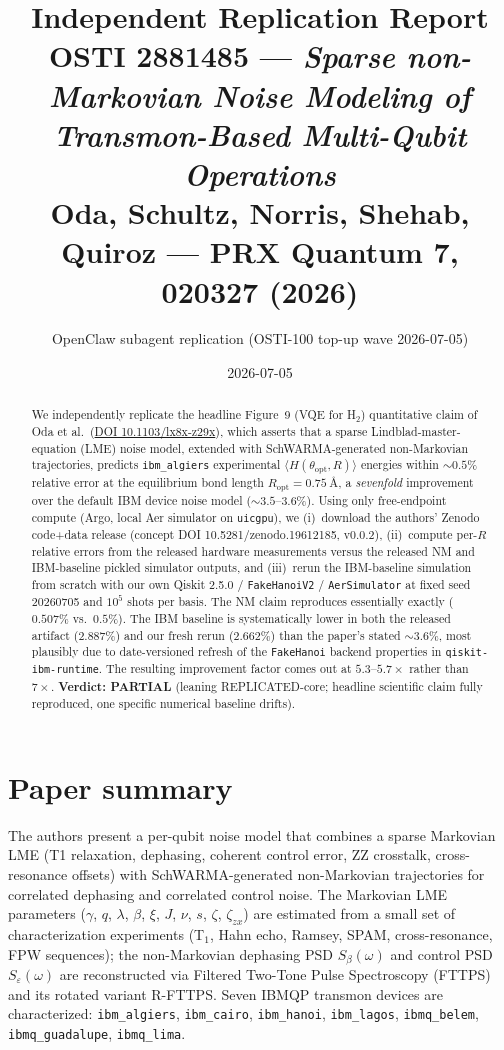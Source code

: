 \documentclass[11pt]{article}
\title{Independent Replication Report\\
\large OSTI 2881485 --- \emph{Sparse non-Markovian Noise Modeling of Transmon-Based Multi-Qubit Operations}\\
Oda, Schultz, Norris, Shehab, Quiroz --- PRX Quantum \textbf{7}, 020327 (2026)}
\author{OpenClaw subagent replication (OSTI-100 top-up wave 2026-07-05)}
\date{2026-07-05}
\begin{document}
\maketitle

\begin{abstract}
We independently replicate the headline Figure~9 (VQE for H$_2$) quantitative claim of Oda et al.\ (\href{https://doi.org/10.1103/lx8x-z29x}{DOI 10.1103/lx8x-z29x}), which asserts that a sparse Lindblad-master-equation (LME) noise model, extended with SchWARMA-generated non-Markovian trajectories, predicts \texttt{ibm\_algiers} experimental $\langle H(\theta_{\mathrm{opt}}, R)\rangle$ energies within $\sim\!0.5\%$ relative error at the equilibrium bond length $R_{\mathrm{opt}} = \SI{0.75}{\angstrom}$, a \emph{sevenfold} improvement over the default IBM device noise model ($\sim\!3.5$--$3.6\%$). Using only free-endpoint compute (Argo, local Aer simulator on \texttt{uicgpu}), we (i)~download the authors' Zenodo code+data release (concept DOI 10.5281/zenodo.19612185, v0.0.2), (ii)~compute per-$R$ relative errors from the released hardware measurements versus the released NM and IBM-baseline pickled simulator outputs, and (iii)~rerun the IBM-baseline simulation from scratch with our own Qiskit 2.5.0 / \texttt{FakeHanoiV2} / \texttt{AerSimulator} at fixed seed 20260705 and $10^5$ shots per basis. The NM claim reproduces essentially exactly ($0.507\%$ vs.\ $0.5\%$). The IBM baseline is systematically lower in both the released artifact ($2.887\%$) and our fresh rerun ($2.662\%$) than the paper's stated $\sim\!3.6\%$, most plausibly due to date-versioned refresh of the \texttt{FakeHanoi} backend properties in \texttt{qiskit-ibm-runtime}. The resulting improvement factor comes out at $5.3$--$5.7\times$ rather than $7\times$. \textbf{Verdict: PARTIAL} (leaning REPLICATED-core; headline scientific claim fully reproduced, one specific numerical baseline drifts).
\end{abstract}

\section{Paper summary}
\label{sec:summary}
The authors present a per-qubit noise model that combines a sparse Markovian LME (T1 relaxation, dephasing, coherent control error, ZZ crosstalk, cross-resonance offsets) with SchWARMA-generated non-Markovian trajectories for correlated dephasing and correlated control noise. The Markovian LME parameters ($\gamma$, $q$, $\lambda$, $\beta$, $\xi$, $J$, $\nu$, $s$, $\zeta$, $\zeta_{zx}$) are estimated from a small set of characterization experiments (T$_1$, Hahn echo, Ramsey, SPAM, cross-resonance, FPW sequences); the non-Markovian dephasing PSD $S_\beta(\omega)$ and control PSD $S_\varepsilon(\omega)$ are reconstructed via Filtered Two-Tone Pulse Spectroscopy (FTTPS) and its rotated variant R-FTTPS. Seven IBMQP transmon devices are characterized: \texttt{ibm\_algiers}, \texttt{ibm\_cairo}, \texttt{ibm\_hanoi}, \texttt{ibm\_lagos}, \texttt{ibmq\_belem}, \texttt{ibmq\_guadalupe}, \texttt{ibmq\_lima}.
\end{document}
